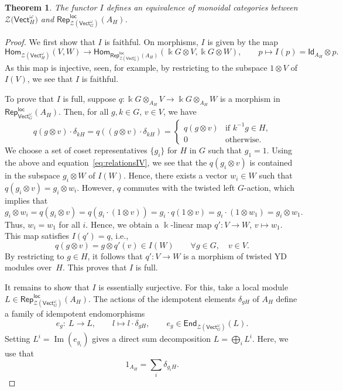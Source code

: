 \documentclass[pdftex]{sigma}
\numberwithin{equation}{section}
\newtheorem{Theorem}{Theorem}[section]
\newcommand{\End}{\mathsf{End}}
\newcommand{\Hom}{\mathsf{Hom}}
\newcommand{\ide}{\mathsf{Id}}
\newcommand{\Img}{\operatorname{Im}}
\newcommand{\locmod}{\mathsf{Rep}^{\mathsf{loc}}}
\newcommand{\Vect}{\mathsf{Vect}}
\newcommand{\cZ}{\mathcal{Z}}
\newcommand{\rI}{I}
\begin{document}
\begin{Theorem}\label{thm:Iequiv}
The functor $\rI$ defines an equivalence of monoidal categories between $\cZ\big(\Vect_H^\omega\big)$ and $\locmod_{\cZ(\Vect_G^\omega)}(A_H)$.
\end{Theorem}
\begin{proof}
We first show that $I$ is faithful. On morphisms, $I$ is given by the map
\[\Hom_{\cZ(\Vect_H^\omega)}(V,W)\to \Hom_{\locmod_{\cZ(\Vect_G^\omega)}(A_H)}(\Bbbk G \otimes V,\Bbbk G \otimes W), \qquad p\mapsto I(p)=\ide_{A_H}\otimes p.\]
As this map is injective, seen, for example, by restricting to the subspace $1\otimes V$ of $I(V)$, we see that $I$ is faithful.

To prove that $I$ is full, suppose $q\colon \Bbbk G \otimes_{A_H} V\to \Bbbk G \otimes_{A_H} W$ is a morphism in $\locmod_{\Vect_G^\omega}(A_H)$.
Then,
for all $g,k\in G$, $v\in V$, we have
 \[q(g\otimes v) \cdot \delta_{kH} = q((g\otimes v) \cdot \delta_{kH}) =
\begin{cases}
q(g\otimes v) & \text{if $k^{-1}g \in H$,}\\
0 & \text{otherwise}.
\end{cases}
\]
We choose a set of coset representatives $\{g_i\}$ for $H$ in $G$ such that $g_1=1$.
Using the above and equation~\eqref{eq:relationsIV}, we see that the $q(g_i\otimes v)$ is contained in the subspace $g_i\otimes W$ of $I(W)$. Hence, there exists a vector $w_i\in W$ such that
$q(g_i\otimes v) = g_i\otimes w_i$. However, $q$ commutes with the twisted left $G$-action, which implies that
\[
g_i\otimes w_i=q(g_i\otimes v)= q(g_i\cdot (1\otimes v))=g_i\cdot q(1\otimes v)=g_i\cdot (1\otimes w_1)=g_i\otimes w_1.
\]
Thus, $w_i=w_1$ for all $i$. Hence, we obtain a $\Bbbk$-linear map $q'\colon V\to W$, $v\mapsto w_1$. This map satisfies $I(q')=q$, i.e.,
\[q(g\otimes v)=g\otimes q'(v)\in I(W) \qquad \forall g\in G,\quad v\in V.\]
By restricting to $g\in H$, it follows that $q'\colon V\to W$ is a morphism of twisted YD modules over~$H$. This proves that $I$ is full.

It remains to show that $I$ is essentially surjective. For this, take a local module $L \in \locmod_{\cZ(\Vect_G^\omega)}(A_H)$. The actions of the idempotent elements $\delta_{gH}$ of $A_H$ define a family of idempotent endomorphisms
\[e_g\colon\ L\to L, \qquad l\mapsto l\cdot \delta_{gH},\qquad e_g\in \End_{\cZ(\Vect_G^\omega)}(L).\]
Setting $L^i = \Img(e_{g_i})$ gives a direct sum decomposition $L=\bigoplus\limits_{i}L^{i}$. Here, we use that \[1_{A_H}=\sum\limits_{i}\delta_{g_iH}.\]


\end{proof}
\end{document}

